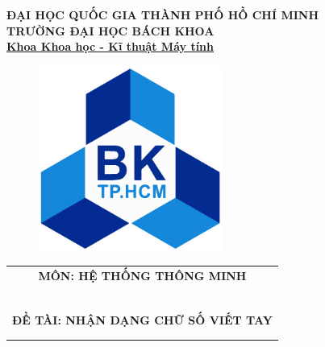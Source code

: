 \documentclass[a4paper]{article}
\begin{document}
\begin{titlepage}
\begin{center}
			
			\textbf{ {\Large ĐẠI HỌC QUỐC GIA THÀNH PHỐ HỒ CHÍ MINH \\
					TRƯỜNG ĐẠI HỌC BÁCH KHOA \\ \underline{Khoa Khoa học - Kĩ thuật Máy tính }} \\ 
			}
			
		\end{center}

\vspace{1cm}

\begin{figure}[h!]
			\begin{center}
				\includegraphics[width=6cm]{hcmut.jpg}
			\end{center}
		\end{figure}

\vspace{1cm}


\begin{center}
			\begin{tabular}{c}

				\textbf{{\Large	 MÔN: HỆ THỐNG THÔNG MINH }}\\
				
			~~\\
				\hline
				\\
		\multicolumn{1}{c}{\textbf{{\Large ĐỀ TÀI: NHẬN DẠNG CHỮ SỐ VIẾT TAY
		}}}
	
		\\

				\\
		\fontsize{18pt}{18pt}\selectfont	%
	
				\\
				\hline
			\end{tabular}
		\end{center}


\end{titlepage}
\end{document}
